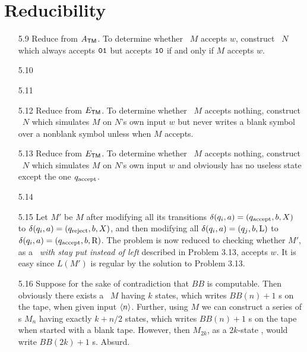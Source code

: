 \section{Reducibility}

\begin{itemize}
	
	\item[5.9]
	Reduce from $A_{\TM}$. To determine whether \TM\ $M$ accepts $w$, construct \TM\ $N$ which always accepts $\TT{01}$ but accepts $\TT{10}$ if and only if $M$ accepts $w$.
	
	\item[5.10]
	\Omit
	
	\item[5.11]
	\Omit
	
	\item[5.12]
	Reduce from $E_{\TM}$. To determine whether \TM\ $M$ accepts nothing, construct \TM\ $N$ which simulates $M$ on $N$'s own input $w$ but never writes a blank symbol over a nonblank symbol unless when $M$ accepts.
	
	\item[5.13]
	Reduce from $E_{\TM}$. To determine whether \TM\ $M$ accepts nothing, construct \TM\ $N$ which simulates $M$ on $N$'s own input $w$ and obviously has no useless state except the one $q_{\RM{accept}}$.
	
	\item[5.14]
	\Empty
	
	\item[5.15]
	Let $M'$ be $M$ after modifying all its transitions $\delta(q_i,a) = (q_{\RM{accept}},b,X)$ to $\delta(q_i,a) = (q_{\RM{reject}},b,X)$, and then modifying all $\delta(q_i,a) = (q_j,b,\RM{L})$ to $\delta(q_i,a) = (q_{\RM{accept}},b,\RM{R})$. The problem is now reduced to checking whether $M'$, as a \emph{\TM\ with stay put instead of left} described in Problem 3.13, accepts $w$. It is easy since $L(M')$ is regular by the solution to Problem 3.13.
	
	\item[5.16]
	Suppose for the sake of contradiction that $BB$ is computable. Then obviously there exists a \TM\ $M$ having $k$ states, which writes $BB(n) + 1$ s on the tape, when given input $\Bra{n}$. Further, using $M$ we can construct a series of \TM s $M_n$ having exactly $k+n/2$ states, which writes $BB(n) + 1$ s on the tape when started with a blank tape. However, then $M_{2k}$, as a $2k$-state \TM , would write $BB(2k) + 1$ s. Absurd.
	

\end{itemize}
